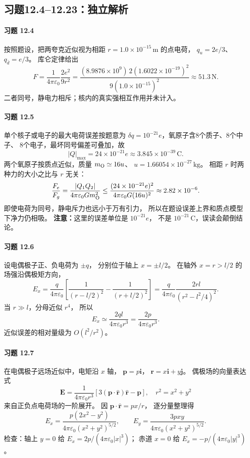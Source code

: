 \subsection*{习题12.4--12.23：独立解析}
\paragraph{习题 12.4}
按照题设，把两夸克近似视为相距
\(r=1.0\times10^{-15}\,\mathrm m\) 的点电荷，
\(q_u=2e/3\)、\(q_{\bar d}=e/3\)。
库仑定律给出
\[
 F=\frac{1}{4\pi\varepsilon_0}\frac{2e^2}{9r^2}
 =\frac{(8.9876\times10^9)\,2(1.6022\times10^{-19})^2}
 {9(1.0\times10^{-15})^2}
 \approx\boxed{51.3\,\mathrm N}.
\]
二者同号，静电力相斥；核内的真实强相互作用并未计入。

\paragraph{习题 12.5}
单个核子或电子的最大电荷误差按题意为
\(\delta q=10^{-21}e\)，氧原子含8个质子、8个中子、
8个电子，最坏同号偏差可叠加，故
\[
 |Q|_{\max}=24\times10^{-21}e
 \approx3.845\times10^{-39}\,\mathrm C.
\]
两个氧原子按质点近似，质量
\(m_{\rm O}\simeq16u\)、
\(u=1.66054\times10^{-27}\,\mathrm{kg}\)。
相距 \(r\) 时两种力的大小之比与 \(r\) 无关：
\[
 \frac{F_e}{F_g}
 =\frac{|Q_1Q_2|}{4\pi\varepsilon_0 G m_{\rm O}^2}
 \le\frac{(24\times10^{-21}e)^2}
 {4\pi\varepsilon_0G(16u)^2}
 \approx2.82\times10^{-6}.
\]
即使电荷为同号，静电斥力也远小于万有引力，
所以在题设误差上界和质点模型下净力仍相吸。
\textbf{注意：}这里的误差单位是 \(10^{-21}e\)，
不是 \(10^{-21}\,\mathrm C\)，误读会颠倒结论。

\paragraph{习题 12.6}
设电偶极子正、负电荷为 \(\pm q\)，
分别位于轴上 \(x=\pm l/2\)。
在轴外 \(x=r>l/2\) 的场强沿偶极矩方向，
\[
 E_x=\frac{q}{4\pi\varepsilon_0}
 \left[\frac1{(r-l/2)^2}-\frac1{(r+l/2)^2}\right]
 =\frac{q}{4\pi\varepsilon_0}
 \frac{2rl}{(r^2-l^2/4)^2}.
\]
当 \(r\gg l\)，分母近似 \(r^4\)，
所以
\[
 \boxed{E_x\simeq\frac{2ql}{4\pi\varepsilon_0r^3}
 =\frac{2p}{4\pi\varepsilon_0r^3}}.
\]
近似误差的相对量级为 \(O(l^2/r^2)\)。

\paragraph{习题 12.7}
在电偶极子远场近似中，电矩沿 \(x\) 轴，
\(\boldsymbol p=p\boldsymbol i\)，
\(\boldsymbol r=x\boldsymbol i+y\boldsymbol j\)。
偶极场的向量表达式
\[
 \boldsymbol E=\frac1{4\pi\varepsilon_0r^3}
 [3(\boldsymbol p\cdot\hat{\boldsymbol r})\hat{\boldsymbol r}
 -\boldsymbol p],\quad r^2=x^2+y^2
\]
来自正负点电荷场的一阶展开。
因 \(\boldsymbol p\cdot\hat{\boldsymbol r}=px/r\)，
逐分量整理得
\[
 \boxed{E_x=
 \frac{p(2x^2-y^2)}
 {4\pi\varepsilon_0(x^2+y^2)^{5/2}},\qquad
 E_y=\frac{3pxy}
 {4\pi\varepsilon_0(x^2+y^2)^{5/2}}}.
\]
检查：轴上 \(y=0\) 给 \(E_x=2p/(4\pi\varepsilon_0|x|^3)\)；
赤道 \(x=0\) 给 \(E_x=-p/(4\pi\varepsilon_0|y|^3)\)。


